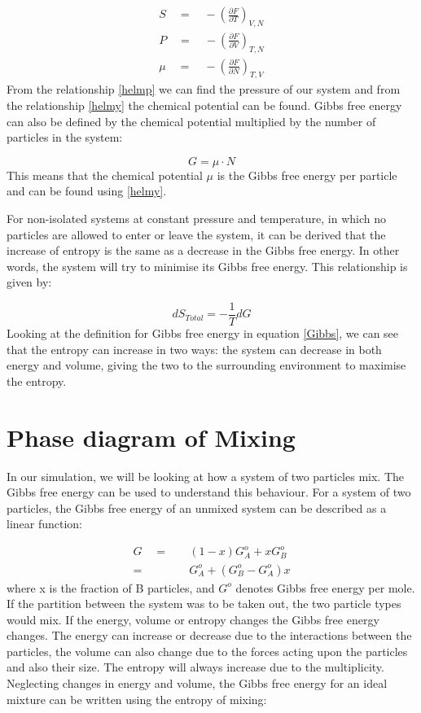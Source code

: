 \documentclass[../hand-in3.tex]{subfiles}
\begin{document}
\begin{align}
S \quad = \quad - \left( \frac{\partial F}{\partial T} \right)_{V,N} \nonumber \\
P \quad = \quad - \left( \frac{\partial F}{\partial V} \right)_{T,N} \label{helmp} \\
\mu \quad = \quad - \left( \frac{\partial F}{\partial N} \right)_{T,V} \label{helmy} 
\end{align}
From the relationship \ref{helmp} we can find the pressure of our system and from the relationship \ref{helmy} the chemical potential can be found. Gibbs free energy can also be defined by the chemical potential multiplied by the number of particles in the system:

\begin{equation}
G = \mu \cdot N
\end{equation} 
This means that the chemical potential $\mu$ is the Gibbs free energy per particle and can be found using \ref{helmy}.

For non-isolated systems at constant pressure and temperature, in which no particles are allowed to enter or leave the system, it can be derived that the increase of entropy is the same as a decrease in the Gibbs free energy. In other words, the system will try to minimise its Gibbs free energy. This relationship is given by:

\begin{equation}
dS_{Total} = - \frac{1}{T} dG
\end{equation}
Looking at the definition for Gibbs free energy in equation \ref{Gibbs}, we can see that the entropy can increase in two ways: the system can decrease in both energy and volume, giving the two to the surrounding environment to maximise the entropy.

\section{Phase diagram of Mixing}

In our simulation, we will be looking at how a system of two particles mix. The Gibbs free energy can be used to understand this behaviour. For a system of two particles, the Gibbs free energy of an unmixed system can be described as a linear function:

\begin{align}
G \quad =& \quad (1-x)G_A^o + xG_B^o \\
  =& \quad G_A^o + (G_B^o- G_A^o)x	
\end{align}   
where x is the fraction of B particles, and $G^o$ denotes Gibbs free energy per mole. If the partition between the system was to be taken out, the two particle types would mix. If the energy, volume or entropy changes the Gibbs free energy changes. The energy can increase or decrease due to the interactions between the particles, the volume can also change due to the forces acting upon the particles and also their size. The entropy will always increase due to the multiplicity. Neglecting changes in energy and volume, the Gibbs free energy for an ideal mixture can be written using the entropy of mixing:
\end{document}

